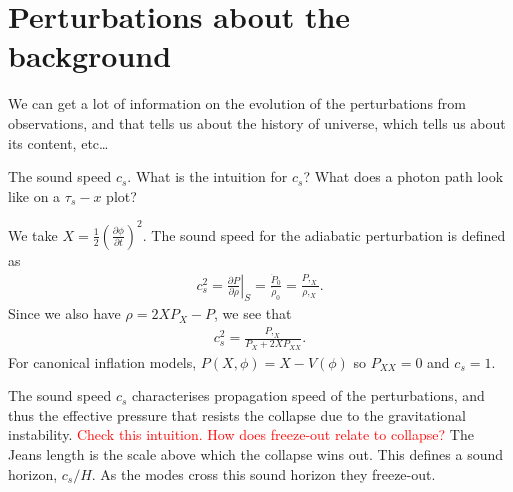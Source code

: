\section{Perturbations about the background}
    We can get a lot of information on the evolution of the perturbations
    from observations, and that tells us about the history of universe,
    which tells us about its content, etc\ldots


    The sound speed $c_s$. What is the intuition for $c_s$?
    What does a photon path look like on a $\tau_s-x$ plot?


    We take $X=\frac{1}{2}\left(\frac{\partial\phi}{\partial t}\right)^2$.
    The sound speed for the adiabatic perturbation is defined as
    \begin{align}
        c_s^2 = \left. \frac{\partial P}{\partial \rho} \right|_S = \frac{\dot{P}_0}{\dot{\rho}_0}
        = \frac{P,_X}{\rho,_X}.
    \end{align}
    Since we also have $\rho=2X P_X-P$, we see that
    \begin{align}
        c_s^2 = \frac{P,_X}{P_X+2X P_{XX}}.
    \end{align}
    For canonical inflation models, $P(X,\phi)=X-V(\phi)$
    so $P_{XX}=0$ and $c_s=1$.


    The sound speed $c_s$ characterises propagation speed of the perturbations,
    and thus the effective pressure that resists the
    collapse due to the gravitational instability.
    \textcolor{red}{Check this intuition. How does freeze-out relate to collapse?}
    The Jeans length is the scale above which the collapse wins out.
    This defines a sound horizon, $c_s/H$.
    As the modes cross this sound horizon they freeze-out.


